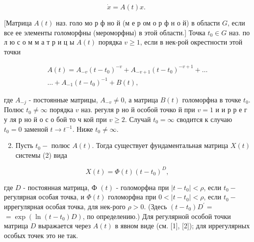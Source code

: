 \documentclass[10pt]{article}
\begin{document}
\[

\dot{x}=A(t) x \text {. }

\]



[Матрица $A(t)$ наз. голо мо р ф но й (м е р ом о р ф н о й) в области $G$, если все ее элементы голоморфны (мероморфны) в этой области.] Точка $t_{0} \in G$ наз. по л ю с о м м а т р и ц ы $A(t)$ порядка $v \geqslant 1$, если в нек-рой окрестности этой точки



\[

\begin{gathered}

A(t)=A_{-v}\left(t-t_{0}\right)^{-v}+A_{-v+1}\left(t-t_{0}\right)^{-v+1}+\ldots \\

\ldots+A_{-1}\left(t-t_{0}\right)^{-1}+B(t),

\end{gathered}

\]



где $A_{-j}$ - постоянные матрицы, $A_{-v} \neq 0$, а матрица $B(t)$ голоморфна в точке $t_{0}$. Полюс $t_{0} \neq \infty$ порядка $v$ наз. регуля р но й особой точко й при $v=1$ и и р р е г у ля р но й о с о бой то ч кой при $v \geqslant 2$. Случай $t_{0}=\infty$ сводится к случаю $t_{0}=0$ заменой $t \rightarrow t^{-1}$. Ниже $t_{0} \neq \infty$.



\begin{enumerate}

  \setcounter{enumi}{1}

  \item Пусть $t_{0}-$ полюс $A(t)$. Тогда существует фундаментальная матрица $X(t)$ системы (2) вида

\end{enumerate}



\[

X(t)=\Phi(t)\left(t-t_{0}\right)^{D},

\]



где $D$ - постоянная матрица, Ф $(t)$ - голоморфна при $\left|t-t_{0}\right|<\rho$, если $t_{0}-$ регулярная особая точка, и $\Phi(t)$ голоморфна при $0<\left|t-t_{0}\right|<\rho$, если $t_{0}-$ иррегулярная особая точка, для нек-рого $\rho>0$. (Здесь $\left(t-t_{0}\right) D^{\prime}=$ $=\exp \left(\ln \left(t-t_{0}\right) D\right)$, по определению.) Для регулярной особой точки матрица $D$ выражается через $A(t)$ в явном виде (см. [1], [2]); для иррегулярных особых точек это не так.
\end{document}
